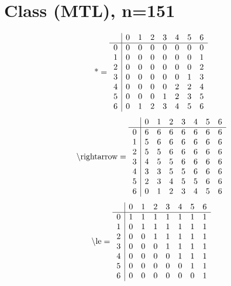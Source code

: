 \documentclass[11pt]{article}
\begin{document}
\section{Class (MTL), n=151}
\[\text{*} = 
\begin{array}{r | r r r r r r r}
 & 0 & 1 & 2 & 3 & 4 & 5 & 6 \\ \hline
0 & 0 & 0 & 0 & 0 & 0 & 0 & 0 \\
1 & 0 & 0 & 0 & 0 & 0 & 0 & 1 \\
2 & 0 & 0 & 0 & 0 & 0 & 0 & 2 \\
3 & 0 & 0 & 0 & 0 & 0 & 1 & 3 \\
4 & 0 & 0 & 0 & 0 & 2 & 2 & 4 \\
5 & 0 & 0 & 0 & 1 & 2 & 3 & 5 \\
6 & 0 & 1 & 2 & 3 & 4 & 5 & 6 \\
\end{array}
\]
\[\text{\textbackslash rightarrow} = 
\begin{array}{r | r r r r r r r}
 & 0 & 1 & 2 & 3 & 4 & 5 & 6 \\ \hline
0 & 6 & 6 & 6 & 6 & 6 & 6 & 6 \\
1 & 5 & 6 & 6 & 6 & 6 & 6 & 6 \\
2 & 5 & 5 & 6 & 6 & 6 & 6 & 6 \\
3 & 4 & 5 & 5 & 6 & 6 & 6 & 6 \\
4 & 3 & 3 & 5 & 5 & 6 & 6 & 6 \\
5 & 2 & 3 & 4 & 5 & 5 & 6 & 6 \\
6 & 0 & 1 & 2 & 3 & 4 & 5 & 6 \\
\end{array}
\]
\[\text{\textbackslash le} = 
\begin{array}{r | r r r r r r r}
 & 0 & 1 & 2 & 3 & 4 & 5 & 6 \\ \hline
0 & 1 & 1 & 1 & 1 & 1 & 1 & 1 \\
1 & 0 & 1 & 1 & 1 & 1 & 1 & 1 \\
2 & 0 & 0 & 1 & 1 & 1 & 1 & 1 \\
3 & 0 & 0 & 0 & 1 & 1 & 1 & 1 \\
4 & 0 & 0 & 0 & 0 & 1 & 1 & 1 \\
5 & 0 & 0 & 0 & 0 & 0 & 1 & 1 \\
6 & 0 & 0 & 0 & 0 & 0 & 0 & 1 \\
\end{array}
\]
\end{document}
